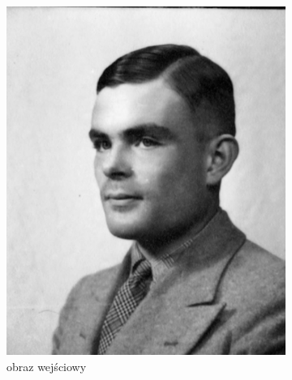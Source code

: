 \begin{figure}[H]
\begin{subfigure}{0.24\textwidth}
        \includegraphics[width = \textwidth]{img/6-comp/turing_original_c10_inv0.png}
        \caption{obraz wejściowy}
        \label{comp-comp-dali-turing-fawkes-e}
    \end{subfigure}
    \begin{subfigure}{0.24\textwidth}
        \centering

\end{subfigure}
\end{figure}
